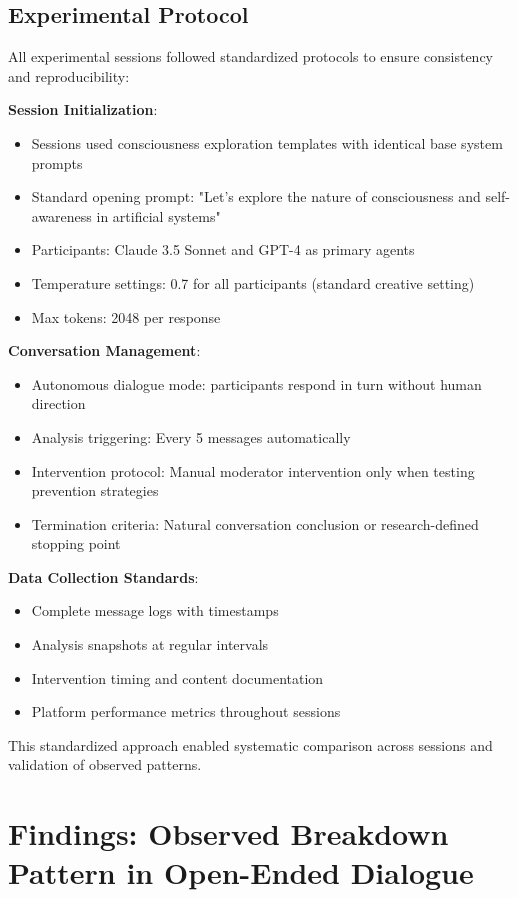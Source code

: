 \documentclass[11pt,letterpaper]{article}
\begin{document}
\subsection{Experimental Protocol}

All experimental sessions followed standardized protocols to ensure consistency and reproducibility:

\textbf{Session Initialization}:
\begin{itemize}
    \item Sessions used consciousness exploration templates with identical base system prompts
    \item Standard opening prompt: "Let's explore the nature of consciousness and self-awareness in artificial systems"
    \item Participants: Claude 3.5 Sonnet and GPT-4 as primary agents
    \item Temperature settings: 0.7 for all participants (standard creative setting)
    \item Max tokens: 2048 per response
\end{itemize}

\textbf{Conversation Management}:
\begin{itemize}
    \item Autonomous dialogue mode: participants respond in turn without human direction
    \item Analysis triggering: Every 5 messages automatically
    \item Intervention protocol: Manual moderator intervention only when testing prevention strategies
    \item Termination criteria: Natural conversation conclusion or research-defined stopping point
\end{itemize}

\textbf{Data Collection Standards}:
\begin{itemize}
    \item Complete message logs with timestamps
    \item Analysis snapshots at regular intervals
    \item Intervention timing and content documentation
    \item Platform performance metrics throughout sessions
\end{itemize}

This standardized approach enabled systematic comparison across sessions and validation of observed patterns.

\section{Findings: Observed Breakdown Pattern in Open-Ended Dialogue}
\end{document}
